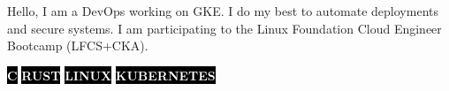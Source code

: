 \documentclass[10pt]{developercv} %
\begin{document}
\vspace{0.5cm}



\hspace{6pt}\begin{minipage}[t]{0.98\textwidth} %
	\vspace{-\baselineskip} %

	{Hello, I am a DevOps working on GKE. I do my best to automate deployments and secure systems. I am participating to the Linux Foundation Cloud Engineer Bootcamp (LFCS+CKA).} %

\end{minipage}
\hfill %


\begin{center}
	\colorbox{black}{{\textcolor{white}{\textbf{\MakeUppercase{C}}}}}
	\colorbox{black}{{\textcolor{white}{\textbf{\MakeUppercase{Rust}}}}}
	\colorbox{black}{{\textcolor{white}{\textbf{\MakeUppercase{Linux}}}}}
	\colorbox{black}{{\textcolor{white}{\textbf{\MakeUppercase{Kubernetes}}}}}
\end{center}


\end{document}
